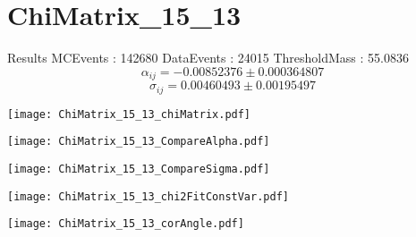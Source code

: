 \documentclass[a4paper,12pt]{article}
\begin{document}
\section{ChiMatrix\_15\_13}
\begin{minipage}{0.49\linewidth} Results \newline
MCEvents : 142680\newline
DataEvents : 24015 \newline
ThresholdMass : 55.0836\\
$$\alpha_{ij} = -0.00852376\pm 0.000364807$$
$$\sigma_{ij} = 0.00460493\pm 0.00195497$$
\end{minipage}\hfill
\begin{minipage}{0.49\linewidth} 
\texttt{[image: ChiMatrix\_15\_13\_chiMatrix.pdf]}\\
\end{minipage}
\hfill
\begin{minipage}{0.49\linewidth} 
\texttt{[image: ChiMatrix\_15\_13\_CompareAlpha.pdf]}\\
\end{minipage}
\hfill
\begin{minipage}{0.49\linewidth} 
\texttt{[image: ChiMatrix\_15\_13\_CompareSigma.pdf]}\\
\end{minipage}
\begin{minipage}{0.49\linewidth} 
\texttt{[image: ChiMatrix\_15\_13\_chi2FitConstVar.pdf]}\\
\end{minipage}
\hfill
\begin{minipage}{0.49\linewidth} 
\texttt{[image: ChiMatrix\_15\_13\_corAngle.pdf]}\\
\end{minipage}
\end{document}
